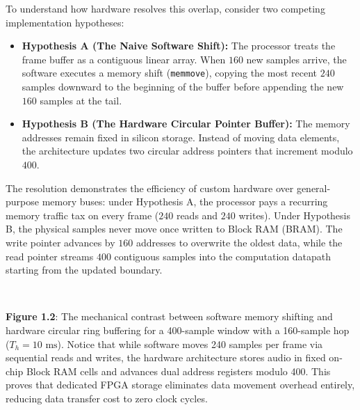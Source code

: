 \documentclass[11pt,a4paper]{article}
\renewcommand{\thefigure}{1.2\alph{figure}}
\begin{document}
To understand how hardware resolves this overlap, consider two competing implementation hypotheses:

\begin{itemize}\setlength{\itemsep}{1pt}\setlength{\parskip}{0pt}
    \item \textbf{Hypothesis A (The Naive Software Shift):} The processor treats the frame buffer as a contiguous linear array. When $160$ new samples arrive, the software executes a memory shift (\texttt{memmove}), copying the most recent $240$ samples downward to the beginning of the buffer before appending the new $160$ samples at the tail.
    \item \textbf{Hypothesis B (The Hardware Circular Pointer Buffer):} The memory addresses remain fixed in silicon storage. Instead of moving data elements, the architecture updates two circular address pointers that increment modulo $400$.
\end{itemize}

The resolution demonstrates the efficiency of custom hardware over general-purpose memory buses: under Hypothesis A, the processor pays a recurring memory traffic tax on every frame ($240$ reads and $240$ writes). Under Hypothesis B, the physical samples never move once written to Block RAM (BRAM). The write pointer advances by $160$ addresses to overwrite the oldest data, while the read pointer streams $400$ contiguous samples into the computation datapath starting from the updated boundary.

\begin{center}\vspace{-2mm}
\begin{minipage}{\textwidth}
\centering
\\[2mm]
\label{fig:1_2a_ring_buffer}
\begin{minipage}{0.95\textwidth}
\small\textbf{Figure \thefigure}: The mechanical contrast between software memory shifting and hardware circular ring buffering for a 400-sample window with a 160-sample hop ($T_h = 10\text{ ms}$). Notice that while software moves 240 samples per frame via sequential reads and writes, the hardware architecture stores audio in fixed on-chip Block RAM cells and advances dual address registers modulo 400. This proves that dedicated FPGA storage eliminates data movement overhead entirely, reducing data transfer cost to zero clock cycles.
\end{minipage}
\end{minipage}\vspace{-2mm}
\end{center}
\end{document}
